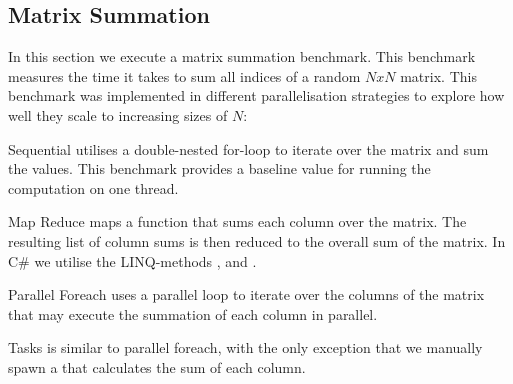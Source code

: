 \newcommand{\workBiasSymbolics}{\symbolic{Work Bias (iterations),134217728,67108864,33554432,16777216,8388608,4194304,2097152,1048576,524288,262144,131072,65536,32768,16384,8192,4096,2048,1024}}


\subsection{Matrix Summation}
In this section we execute a matrix summation benchmark. This benchmark measures the time it takes to sum all indices of a random $N x N$ matrix. This benchmark was implemented in different parallelisation strategies to explore how well they scale to increasing sizes of $N$:

\begin{labeling}{\quad\quad}
    \item[Sequential] utilises a double-nested for-loop to iterate over the matrix and sum the values. This benchmark provides a baseline value for running the computation on one thread.
    \item[Map Reduce] maps a function that sums each column over the matrix. The resulting list of column sums is then reduced to the overall sum of the matrix. In C\# we utilise the \gls{LINQ}-methods ,  and .
    \item[Parallel Foreach] uses a parallel loop to iterate over the columns of the matrix that may execute the summation of each column in parallel.
    \item[Tasks] is similar to parallel foreach, with the only exception that we manually spawn a  that calculates the sum of each column.
\end{labeling}

